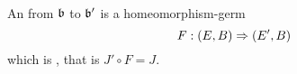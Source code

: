  \\
An  from $\mathfrak{b}$ to $\mathfrak{b}'$ is a homeomorphism-germ 
\[ F: (E, B) \Rightarrow (E', B) \]
which is , that is $J' \circ F = J$.